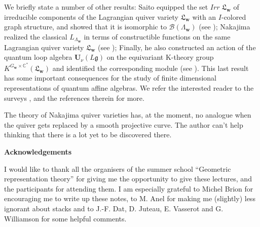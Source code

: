 \documentclass[a4paper,10pt]{amsart}
\def\U{\mathbf{U}}
\def\C{\mathbb{C}}
\def\g{\mathfrak{g}}
\numberwithin{equation}{section}
\begin{document}
We briefly state a number of other results: Saito equipped the set $Irr\;\mathfrak{L}_{\mathbf{w}}$ of irreducible components of the Lagrangian quiver variety $\mathfrak{L}_{\mathbf{w}}$ with an $I$-colored graph structure, and showed that it is isomorphic to $\mathcal{B}(\Lambda_{\mathbf{w}})$ (see \cite{Saito}); Nakajima realized the classical $L_{\Lambda_{\mathbf{w}}}$ in terms of constructible functions on the same Lagrangian quiver variety $\mathfrak{L}_{\mathbf{w}}$ (see \cite{Nak2}); Finally, he also constructed an action of the quantum loop algebra $\U_{\nu}(L\g)$ on the equivariant K-theory group $K^{G_{\mathbf{w}} \times \C^*}(\mathfrak{L}_{\mathbf{w}})$ and identified the corresponding module (see \cite{Nak3}). This last result has some important consequences for the study of finite dimensional representations of quantum affine algebras. We refer the interested reader to the surveys \cite{Naksurvey}, \cite{Snaksurvey} and the references therein for more.

\vspace{.1in}

The theory of Nakajima quiver varieties has, at the moment, no analogue when the quiver gets replaced by a smooth projective curve. The author can't help thinking that there is a lot yet to be discovered there.

\newpage

\centerline{\textbf{Acknowledgements}}

\vspace{.1in}

I would like to thank all the organisers of the summer school ``Geometric representation theory'' for giving me the opportunity to give these lectures, and the participants for attending them. I am especially grateful to Michel Brion for encouraging me to write up these notes, to M. Anel for making me (slightly) less ignorant about stacks and to J.-F. Dat, D. Juteau, E. Vasserot and G. Williamson for some helpful comments.

\vspace{.2in}
\end{document}
